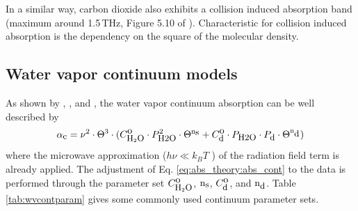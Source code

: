 In a similar way, carbon dioxide also exhibits a collision induced
absorption band (maximum around 1.5\,THz, Figure 5.10 of
\citet{goodyandyung:89}). Characteristic for collision induced
absorption is the dependency on the square of the molecular density.



\subsection{Water vapor continuum models}
\label{leveld:h2o_Cont}
As shown by \citet{liebeandlayton:87}, \citet{pwr:98}, and \citet{ma:90},
the water vapor continuum absorption can be well described by 
\begin{equation} 
  \label{eq:abs_theory:abs_cont}
  \alphac = \nu^2 \cdot \Theta^{3} \cdot 
            (\cso \cdot \phzo^2 \cdot \Theta^{\xs} + 
             \cdo \cdot \phzo \cdot \pda \cdot \Theta^{\xd})  %
\end{equation}
where the microwave approximation ($h\nu\ll k_BT$ ) of the radiation field term 
is already applied. The adjustment of Eq. \ref{eq:abs_theory:abs_cont} to the data 
is performed through the parameter set $C^{\mbox{\rm o}}_{\mbox{\rm \small H}_{2}\mbox{\rm \small O}}$, ${\rm n}_{\mbox{\rm \small s}}$, $C^{\mbox{\rm o}}_{\mbox{\rm \small d}}$, and ${\rm n}_{\mbox{\rm \small d}}$. 
Table \ref{tab:wvcontparam} gives some commonly used continuum parameter sets.
